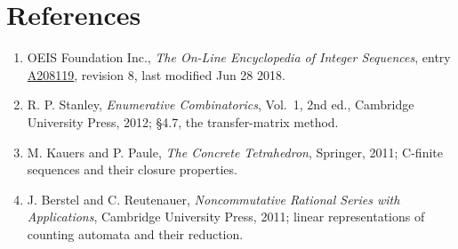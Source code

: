 \documentclass[11pt]{article}
\theoremstyle{definition}
\begin{document}
\section{References}

\begin{enumerate}

\item OEIS Foundation Inc., \emph{The On-Line Encyclopedia of Integer Sequences}, entry \href{https://oeis.org/A208119}{A208119}, revision 8, last modified Jun 28 2018.

\item R. P. Stanley, \emph{Enumerative Combinatorics}, Vol.~1, 2nd ed., Cambridge University Press, 2012; \S4.7, the transfer-matrix method.

\item M. Kauers and P. Paule, \emph{The Concrete Tetrahedron}, Springer, 2011; C-finite sequences and their closure properties.

\item J. Berstel and C. Reutenauer, \emph{Noncommutative Rational Series with Applications}, Cambridge University Press, 2011; linear representations of counting automata and their reduction.

\end{enumerate}
\end{document}
